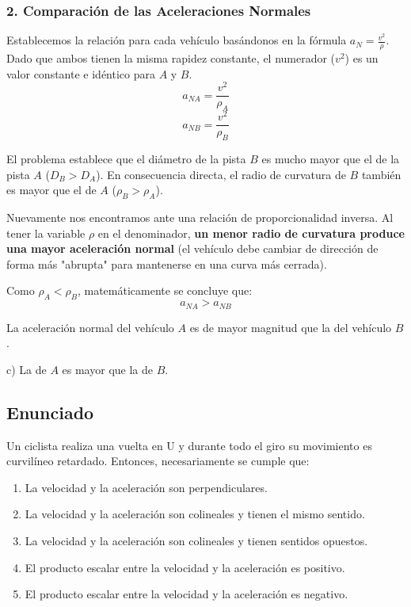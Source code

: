 \documentclass[12pt, a4paper]{article}
\begin{document}
\subsubsection*{2. Comparación de las Aceleraciones Normales}
Establecemos la relación para cada vehículo basándonos en la fórmula $a_N = \frac{v^2}{\rho}$.
Dado que ambos tienen la misma rapidez constante, el numerador ($v^2$) es un valor constante e idéntico para $A$ y $B$.
$$ a_{NA} = \frac{v^2}{\rho_A} $$
$$ a_{NB} = \frac{v^2}{\rho_B} $$

El problema establece que el diámetro de la pista $B$ es mucho mayor que el de la pista $A$ ($D_B > D_A$). En consecuencia directa, el radio de curvatura de $B$ también es mayor que el de $A$ ($\rho_B > \rho_A$).

Nuevamente nos encontramos ante una relación de proporcionalidad inversa. Al tener la variable $\rho$ en el denominador, \textbf{un menor radio de curvatura produce una mayor aceleración normal} (el vehículo debe cambiar de dirección de forma más "abrupta" para mantenerse en una curva más cerrada).

Como $\rho_A < \rho_B$, matemáticamente se concluye que:
$$ a_{NA} > a_{NB} $$

La aceleración normal del vehículo $A$ es de mayor magnitud que la del vehículo $B$.

\begin{tcolorbox}[colback=green!5!white, colframe=green!50!black, title=Respuesta Final]
\centering \Large c) La de $A$ es mayor que la de $B$.
\end{tcolorbox}

\newpage

\subsection*{Enunciado}
Un ciclista realiza una vuelta en U y durante todo el giro su movimiento es curvilíneo retardado. Entonces, necesariamente se cumple que:

\begin{enumerate}[label=\alph*)]
    \item La velocidad y la aceleración son perpendiculares.
    \item La velocidad y la aceleración son colineales y tienen el mismo sentido.
    \item La velocidad y la aceleración son colineales y tienen sentidos opuestos.
    \item El producto escalar entre la velocidad y la aceleración es positivo.
    \item El producto escalar entre la velocidad y la aceleración es negativo.
\end{enumerate}
\end{document}
